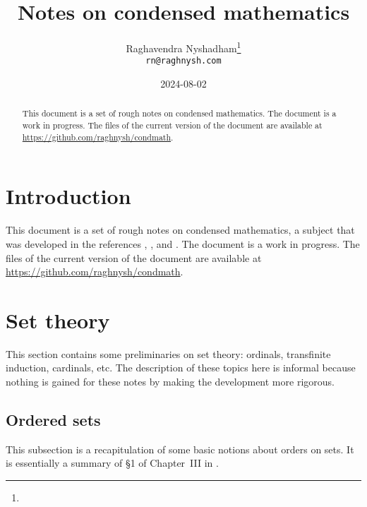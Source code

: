 \documentclass{article}
\title{Notes on condensed mathematics}
\author{Raghavendra Nyshadham\thanks{\cczero} \\
  {\normalsize\nolinkurl{rn@raghnysh.com}}}
\date{2024-08-02}
\begin{document}
\begin{titlingpage}
  \maketitle

  \begin{abstract}
    This document is a set of rough notes on condensed mathematics.
    The document is a work in progress.  The files of the current
    version of the document are available at
    \url{https://github.com/raghnysh/condmath}.


  \end{abstract}
\end{titlingpage}

\tableofcontents

\section{Introduction}
\label{sec:113nrd0o}

This document is a set of rough notes on condensed mathematics, a
subject that was developed in the references \textcite{bib:872u2noz},
\textcite{bib:iy49ytm3}, and \textcite{bib:7k2n4jtn}.  The document is
a work in progress.  The files of the current version of the document
are available at \url{https://github.com/raghnysh/condmath}.

\section{Set theory}
\label{sec:pafnta4o}

This section contains some preliminaries on set theory: ordinals,
transfinite induction, cardinals, etc.  The description of these
topics here is informal because nothing is gained for these notes by
making the development more rigorous.

\subsection{Ordered sets}
\label{sec:5f3q5o8v}

This subsection is a recapitulation of some basic notions about orders
on sets.  It is essentially a summary of \S1 of Chapter~III in
\textcite{bib:lmhdqwpw}.
\end{document}
